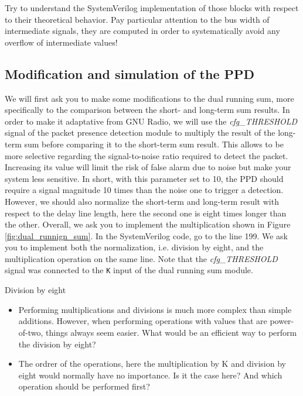 Try to understand the SystemVerilog implementation of those blocks with respect to their theoretical behavior. Pay particular attention to the bus width of intermediate signals, they are computed in order to systematically avoid any overflow of intermediate values!


\subsection{Modification and simulation of the PPD}


We will first ask you to make some modifications to the dual running sum, more specifically to the comparison between the short- and long-term sum results. In order to make it adaptative from GNU Radio, we will use the \textit{cfg\_THRESHOLD} signal of the packet presence detection module to multiply the result of the long-term sum before comparing it to the short-term sum result. This allows to be more selective regarding the signal-to-noise ratio required to detect the packet. Increasing its value will limit the risk of false alarm due to noise but make your system less sensitive. In short, with this parameter set to 10, the PPD should require a signal magnitude 10 times than the noise one to trigger a detection. However, we should also normalize the short-term and long-term result with respect to the delay line length, here the second one is eight times longer than the other. Overall, we ask you to implement the multiplication shown in Figure \ref{fig:dual_runnign_sum}. In the SystemVerilog code, go to the line 199. We ask you to implement both the normalization, i.e. division by eight, and the multiplication operation on the same line. Note that the \textit{cfg\_THRESHOLD} signal was connected to the \texttt{K} input of the dual running sum module.


\begin{bclogo}[couleur = gray!20, arrondi = 0.2, logo=\bcquestion]{Division by eight}
    \begin{itemize}
        \item Performing multiplications and divisions is much more complex than simple additions. However, when performing operations with values that are power-of-two, things always seem easier. What would be an efficient way to perform the division by eight?
        \item The ordrer of the operations, here the multiplication by K and division by eight would normally have no importance. Is it the case here? And which operation should be performed first?
    \end{itemize}
\end{bclogo}

